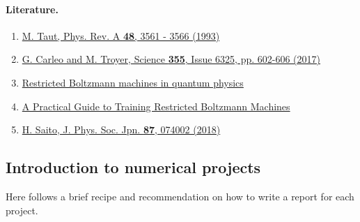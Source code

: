 \documentclass[%
oneside,                 %
final,                   %
10pt]{article}
\begin{document}
\paragraph{Literature.}
\begin{enumerate}
 \item \href{{https://journals.aps.org/pra/abstract/10.1103/PhysRevA.48.3561}}{M. Taut, Phys. Rev. A \textbf{48}, 3561 - 3566 (1993)}

 \item \href{{http://science.sciencemag.org/content/355/6325/602}}{G. Carleo and M. Troyer, Science \textbf{355}, Issue 6325, pp. 602-606 (2017)}

 \item \href{{https://www.nature.com/articles/s41567-019-0545-1}}{Restricted Boltzmann machines in quantum physics}

 \item \href{{https://www.cs.toronto.edu/~hinton/absps/guideTR.pdf}}{A Practical Guide to Training Restricted Boltzmann Machines}

 \item \href{{https://journals.jps.jp/doi/10.7566/JPSJ.87.074002}}{H. Saito, J. Phys. Soc. Jpn. \textbf{87}, 074002 (2018)}
\end{enumerate}

\noindent
\subsection*{Introduction to numerical projects}

Here follows a brief recipe and recommendation on how to write a report for each
project.
\end{document}
